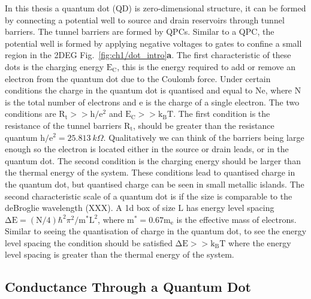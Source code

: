 In this thesis a quantum dot (QD) is zero-dimensional structure, it can be formed by connecting a potential well to source and drain reservoirs through tunnel barriers. The tunnel barriers are formed by QPCs. Similar to a QPC, the potential well is formed by applying negative voltages to gates to confine a small region in the 2DEG Fig.~\ref{fig:ch1/dot_intro}\textbf{a}. The first characteristic of these dots is the charging energy $\mathrm{E_C}$, this is the energy required to add or remove an electron from the quantum dot due to the Coulomb force. Under certain conditions the charge in the quantum dot is quantised and equal to $\mathrm{Ne}$, where $\mathrm{N}$ is the total number of electrons and $\mathrm{e}$ is the charge of a single electron. The two conditions are $\mathrm{R_t}>>\mathrm{h/e^2}$ and $\mathrm{E_C}>>\mathrm{k_BT}$. The first condition is the resistance of the tunnel barriers $\mathrm{R_t}$, should be greater than the resistance quantum $\mathrm{h/e^2}=\qty{25.813}{k\Omega}$. Qualitatively we can think of the barriers being large enough so the electron is located either in the source or drain leads, or in the quantum dot. The second condition is the charging energy should be larger than the thermal energy of the system. These conditions lead to quantised charge in the quantum dot, but quantised charge can be seen in small metallic islands. The second characteristic scale of a quantum dot is if the size is comparable to the deBroglie wavelength (XXX). A 1d box of size $\mathrm{L}$ has energy level spacing $\mathrm{\Delta E}=(\mathrm{N}/4)\hbar^2\pi^2 / \mathrm{m^*L^2}$, where $\mathrm{m^*}=0.67\mathrm{m_e}$ is the effective mass of electrons. Similar to seeing the quantisation of charge in the quantum dot, to see the energy level spacing the condition should be satisfied $\mathrm{\Delta E}>>\mathrm{k_BT}$ where the energy level spacing is greater than the thermal energy of the system. 

\afterpage{\clearpage}
\subsection{Conductance Through a Quantum Dot}

